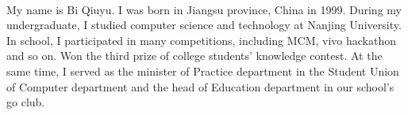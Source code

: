 \documentclass[9pt]{developercv} %
\begin{document}
\begin{minipage}[t]{0.275\textwidth} %
    \vspace{-\baselineskip} %

    \\
\end{minipage}

\vspace{0.5cm}



\begin{minipage}[t]{0.4\textwidth} %
    \vspace{-\baselineskip} %

    My name is Bi Qiuyu. I was born in Jiangsu province, China in 1999. During my undergraduate, I studied computer science and technology at Nanjing University. In school, I participated in many competitions, including MCM, vivo hackathon and so on. Won the third prize of college students' knowledge contest. At the same time, I served as the minister of Practice department in the Student Union of Computer department and the head of Education department in our school's go club.
\end{minipage}
\hfill %
\begin{minipage}[t]{0.5\textwidth} %
    \vspace{-\baselineskip} %
    \begin{barchart}{5.5}
    \end{barchart}
\end{minipage}
\end{document}
